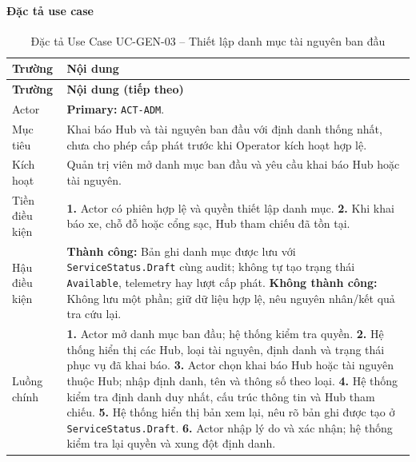\paragraph{Đặc tả use case}
\small
\begin{longtable}{|L{26mm}|L{118mm}|}
  \caption{Đặc tả Use Case UC-GEN-03 -- Thiết lập danh mục tài nguyên ban đầu}\label{tab:spec-UC-GEN-03}\\
  \hline
  \textbf{Trường} & \textbf{Nội dung}\\\hline
  \endfirsthead
  \hline
  \textbf{Trường} & \textbf{Nội dung (tiếp theo)}\\\hline
  \endhead
  Actor & \textbf{Primary:} \texttt{ACT-ADM}.\\\hline
  Mục tiêu & Khai báo Hub và tài nguyên ban đầu với định danh thống nhất, chưa cho phép cấp phát trước khi Operator kích hoạt hợp lệ.\\\hline
  Kích hoạt & Quản trị viên mở danh mục ban đầu và yêu cầu khai báo Hub hoặc tài nguyên.\\\hline
  Tiền điều kiện & \textbf{1.} Actor có phiên hợp lệ và quyền thiết lập danh mục.\newline
\textbf{2.} Khi khai báo xe, chỗ đỗ hoặc cổng sạc, Hub tham chiếu đã tồn tại.\\\hline
  Hậu điều kiện & \textbf{Thành công:} Bản ghi danh mục được lưu với \texttt{ServiceStatus.Draft} cùng audit; không tự tạo trạng thái \texttt{Available}, telemetry hay lượt cấp phát.\newline
  \textbf{Không thành công:} Không lưu một phần; giữ dữ liệu hợp lệ, nêu nguyên nhân/kết quả tra cứu lại.\\\hline
  Luồng chính & \textbf{1.} Actor mở danh mục ban đầu; hệ thống kiểm tra quyền.\newline
\textbf{2.} Hệ thống hiển thị các Hub, loại tài nguyên, định danh và trạng thái phục vụ đã khai báo.\newline
\textbf{3.} Actor chọn khai báo Hub hoặc tài nguyên thuộc Hub; nhập định danh, tên và thông số theo loại.\newline
\textbf{4.} Hệ thống kiểm tra định danh duy nhất, cấu trúc thông tin và Hub tham chiếu.\newline
\textbf{5.} Hệ thống hiển thị bản xem lại, nêu rõ bản ghi được tạo ở \texttt{ServiceStatus.Draft}.\newline
\textbf{6.} Actor nhập lý do và xác nhận; hệ thống kiểm tra lại quyền và xung đột định danh.\newline

\end{longtable}
